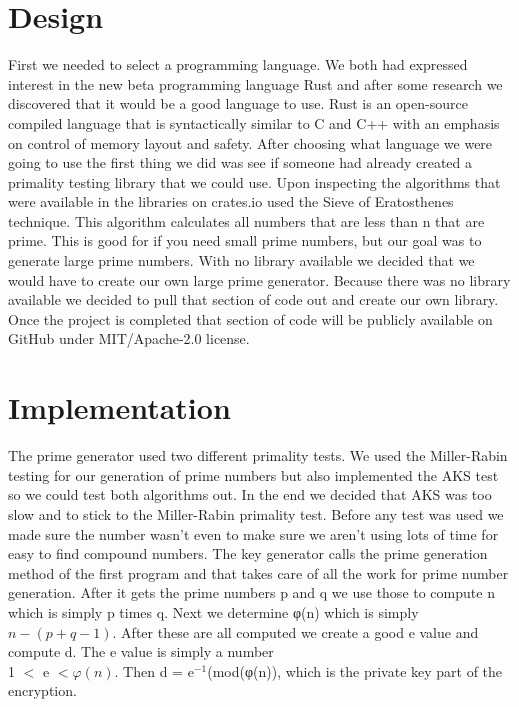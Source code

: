 \documentclass[12pt,journal,compsoc]{IEEEtran}
\begin{document}
\section{Design}
First we needed to select a programming language. We both had expressed interest in the new beta programming language Rust and after some research we discovered that it would be a good language to use. Rust is an open-source compiled language that is syntactically similar to C and C++ with an emphasis on control of memory layout and safety.  
\newline
\indent After choosing what language we were going to use the first thing we did was see if someone had already created a primality testing library that we could use. Upon inspecting the algorithms that were available in the libraries on crates.io used the Sieve of Eratosthenes technique. This algorithm calculates all numbers that are less than n that are prime. This is good for if you need small prime numbers, but our goal was to generate large prime numbers. \newline \indent
With no library available we decided that we would have to create our own large prime generator. Because there was no library available we decided to pull that section of code out and create our own library. Once the project is completed that section of code will be publicly available on GitHub under MIT/Apache-2.0 license.


\section{Implementation}
The prime generator used two different primality tests. We used the Miller-Rabin testing for our generation of prime numbers but also implemented the AKS test so we could test both algorithms out.
In the end we decided that AKS was too slow and to stick to the Miller-Rabin primality test.
Before any test was used we made sure the number wasn't even to make sure we aren't using lots of time for easy to find compound numbers.
\newline \indent The key generator calls the prime generation method of the first program and that takes care of all the work for prime number generation. After it gets the prime numbers p and q we use those to compute n which is simply p times q. Next we determine φ(n) which is simply $n - (p + q -1)$. After these are all computed we create a good e value and compute d. The e value is simply a number \\1 $<$ e $<φ(n)$. Then d = e$^{-1}$(mod(φ(n)), which is the private key part of the encryption.
\end{document}
